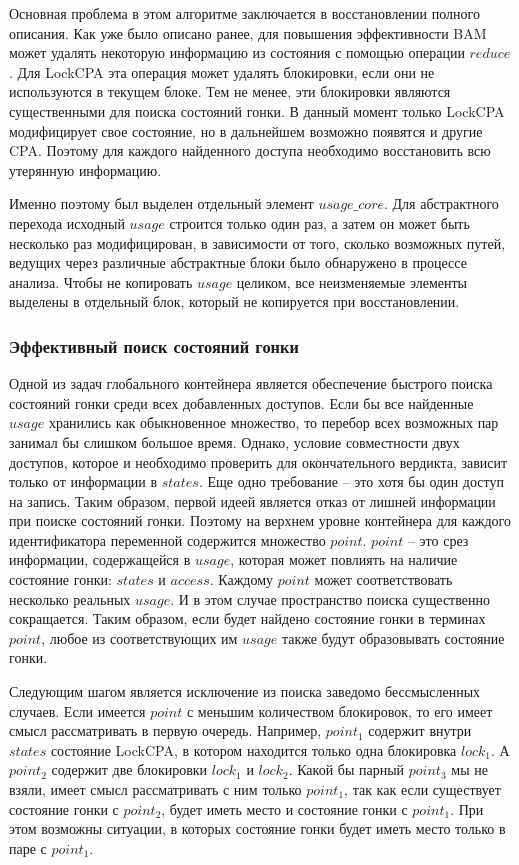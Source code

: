 Основная проблема в этом алгоритме заключается в восстановлении полного описания.
Как уже было описано ранее, для повышения эффективности BAM может удалять некоторую информацию из состояния с помощью операции $reduce$.
Для LockCPA эта операция может удалять блокировки, если они не используются в текущем блоке.
Тем не менее, эти блокировки являются существенными для поиска состояний гонки.
В данный момент только LockCPA модифицирует свое состояние, но в дальнейшем возможно появятся и другие CPA.
Поэтому для каждого найденного доступа необходимо восстановить всю утерянную информацию.

Именно поэтому был выделен отдельный элемент $usage\_core$. 
Для абстрактного перехода исходный $usage$ строится только один раз, а затем он может быть несколько раз модифицирован, в зависимости от того, сколько возможных путей, ведущих через различные абстрактные блоки было обнаружено в процессе анализа.
Чтобы не копировать $usage$ целиком, все неизменяемые элементы выделены в отдельный блок, который не копируется при восстановлении.

\subsubsection{Эффективный поиск состояний гонки}

Одной из задач глобального контейнера является обеспечение быстрого поиска состояний гонки среди всех добавленных доступов.
Если бы все найденные $usage$ хранились как обыкновенное множество, то перебор всех возможных пар занимал бы слишком большое время.
Однако, условие совместности двух доступов, которое и необходимо проверить для окончательного вердикта, зависит только от информации в $states$.
Еще одно требование -- это хотя бы один доступ на запись.
Таким образом, первой идеей является отказ от лишней информации при поиске состояний гонки.
Поэтому на верхнем уровне контейнера для каждого идентификатора переменной содержится множество $point$.
$point$ -- это срез информации, содержащейся в $usage$, которая может повлиять на наличие состояние гонки: $states$ и $access$.
Каждому $point$ может соответствовать несколько реальных $usage$. 
И в этом случае пространство поиска существенно сокращается.
Таким образом, если будет найдено состояние гонки в терминах $point$, любое из соответствующих им $usage$ также будут образовывать состояние гонки.

Следующим шагом является исключение из поиска заведомо бессмысленных случаев.
Если имеется $point$ с меньшим количеством блокировок, то его имеет смысл рассматривать в первую очередь.
Например, $point_1$ содержит внутри $states$ состояние LockCPA, в котором находится только одна блокировка $lock_1$.
А $point_2$ содержит две блокировки $lock_1$ и $lock_2$.
Какой бы парный $point_3$ мы не взяли, имеет смысл рассматривать с ним только $point_1$, так как если существует состояние гонки с $point_2$, будет иметь место и состояние гонки с $point_1$.
При этом возможны ситуации, в которых состояние гонки будет иметь место только в паре с $point_1$.

